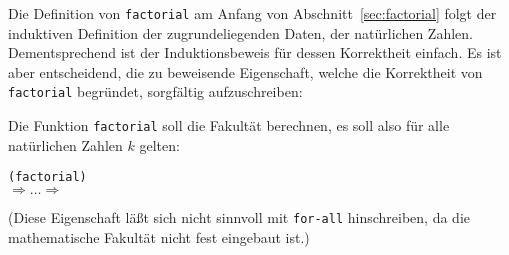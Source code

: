 Die Definition von \texttt{factorial} am Anfang von
Abschnitt~\ref{sec:factorial} folgt der induktiven Definition der
zugrundeliegenden Daten, der natürlichen Zahlen.  Dementsprechend ist
der Induktionsbeweis für dessen Korrektheit einfach.  Es ist aber
entscheidend, die zu beweisende Eigenschaft, welche die Korrektheit
von \texttt{factorial} begründet, sorgfältig aufzuschreiben:

Die Funktion \texttt{factorial} soll die Fakultät berechnen, es soll
also für alle natürlichen Zahlen $k$ gelten:
%
\begin{alltt}
(factorial )
\(\Longrightarrow\ldots\Longrightarrow\) 
\end{alltt}
%
(Diese Eigenschaft läßt sich nicht sinnvoll mit \texttt{for-all}
hinschreiben, da die mathematische Fakultät nicht fest eingebaut ist.)

